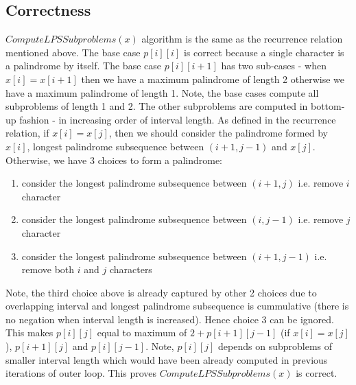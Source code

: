 \documentclass{article}
\begin{document}
    \subsection*{Correctness}
    $ComputeLPSSubproblems(x)$ algorithm is the same as the recurrence relation mentioned above. The base case $p[i][i]$ is correct because a single character is a palindrome by itself. The base case $p[i][i+1]$ has two sub-cases - when $x[i] = x[i+1]$ then we have a maximum palindrome of length 2 otherwise we have a maximum palindrome of length 1. Note, the base cases compute all subproblems of length 1 and 2. The other subproblems are computed in bottom-up fashion - in increasing order of interval length. As defined in the recurrence relation, if $x[i] = x[j]$, then we should consider the palindrome formed by $x[i]$, longest palindrome subsequence between $(i+1, j-1)$ and $x[j]$. Otherwise, we have 3 choices to form a palindrome:
    
    \begin{enumerate}
        \item consider the longest palindrome subsequence between $(i+1, j)$ i.e. remove $i$ character
        \item consider the longest palindrome subsequence between $(i, j-1)$ i.e. remove $j$ character
        \item consider the longest palindrome subsequence between $(i+1, j-1)$ i.e. remove both $i$ and $j$ characters
    \end{enumerate}
    
    Note, the third choice above is already captured by other 2 choices due to overlapping interval and longest palindrome subsequence is cummulative (there is no negation when interval length is increased). Hence choice 3 can be ignored. This makes $p[i][j]$ equal to maximum of $2 + p[i+1][j-1]$ (if $x[i] = x[j]$), $p[i+1][j]$ and $p[i][j-1]$. Note, $p[i][j]$ depends on subproblems of smaller interval length which would have been already computed in previous iterations of outer loop. This proves $ComputeLPSSubproblems(x)$ is correct.
\end{document}
